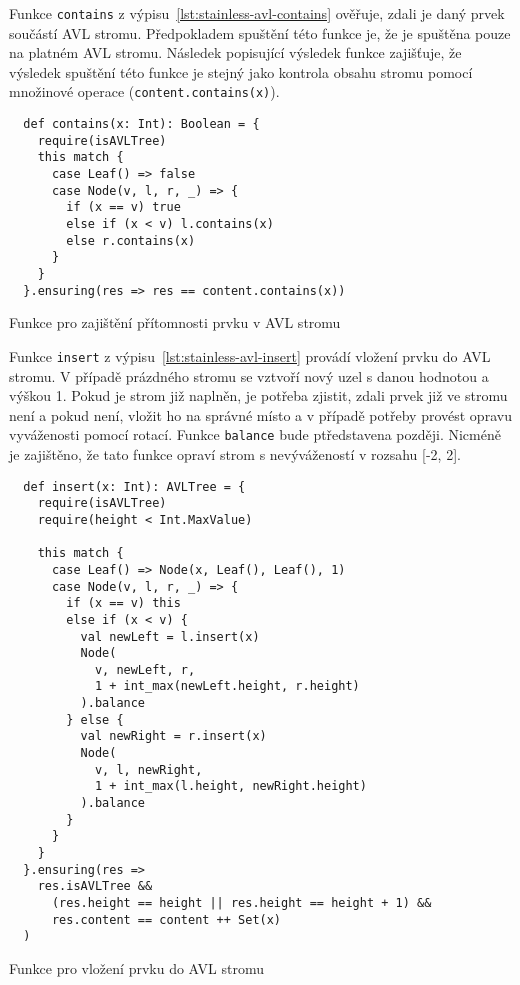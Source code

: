 Funkce \texttt{contains} z výpisu~\ref{lst:stainless-avl-contains}
ověřuje, zdali je daný prvek součástí AVL stromu.
Předpokladem spuštění této funkce je, že je spuštěna pouze na platném AVL stromu.
Následek popisující výsledek funkce zajišťuje,
že výsledek spuštění této funkce je stejný jako kontrola obsahu stromu pomocí množinové operace (\texttt{content.contains(x)}).

\begin{listing}[H]
  \begin{verbatim}
  def contains(x: Int): Boolean = {
    require(isAVLTree)
    this match {
      case Leaf() => false
      case Node(v, l, r, _) => {
        if (x == v) true
        else if (x < v) l.contains(x)
        else r.contains(x)
      }
    }
  }.ensuring(res => res == content.contains(x))
  \end{verbatim}
  \caption{Funkce pro zajištění přítomnosti prvku v AVL stromu}
  \label{lst:stainless-avl-contains}
\end{listing}

Funkce \texttt{insert} z výpisu~\ref{lst:stainless-avl-insert}
provádí vložení prvku do AVL stromu.
V případě prázdného stromu se vztvoří nový uzel s danou hodnotou a výškou 1.
Pokud je strom již naplněn,
je potřeba zjistit, zdali prvek již ve stromu není a pokud není,
vložit ho na správné místo a v případě potřeby provést opravu vyváženosti pomocí rotací.
Funkce \texttt{balance} bude ptředstavena později.
Nicméně je zajištěno, že tato funkce opraví strom s nevývážeností v rozsahu [-2, 2].

\begin{listing}[H]
  \begin{verbatim}
  def insert(x: Int): AVLTree = {
    require(isAVLTree)
    require(height < Int.MaxValue)

    this match {
      case Leaf() => Node(x, Leaf(), Leaf(), 1)
      case Node(v, l, r, _) => {
        if (x == v) this
        else if (x < v) {
          val newLeft = l.insert(x)
          Node(
            v, newLeft, r,
            1 + int_max(newLeft.height, r.height)
          ).balance
        } else {
          val newRight = r.insert(x)
          Node(
            v, l, newRight,
            1 + int_max(l.height, newRight.height)
          ).balance
        }
      }
    }
  }.ensuring(res =>
    res.isAVLTree &&
      (res.height == height || res.height == height + 1) &&
      res.content == content ++ Set(x)
  )
  \end{verbatim}
  \caption{Funkce pro vložení prvku do AVL stromu}
  \label{lst:stainless-avl-insert}
\end{listing}

